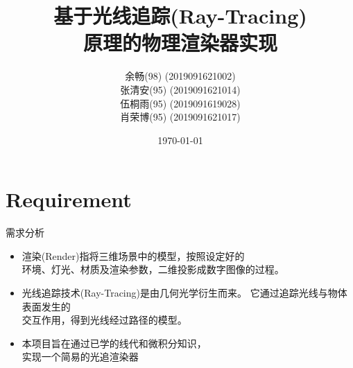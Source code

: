 \documentclass{beamer}
\begin{document}
\title[\sc Ray-Traing based Renderer]{\sc 基于光线追踪(Ray-Tracing) \\ 原理的物理渲染器实现}
\author{ \normalsize 余畅(98) \quad \tiny (2019091621002) \\
 \normalsize 张清安(95) \qquad \tiny (2019091621014) \\
 \normalsize 伍桐雨(95) \quad \tiny (2019091619028) \\
 \normalsize 肖荣博(95) \quad \tiny (2019091621017)}
\date{\today}
\frame{\titlepage}

\section{Requirement}
\begin{frame} {需求分析}
		\begin{itemize}
\item 渲染(Render)指将三维场景中的模型，按照设定好的 \\ 环境、灯光、材质及渲染参数，二维投影成数字图像的过程。
\item 光线追踪技术(Ray-Tracing)是由几何光学衍生而来。 它通过追踪光线与物体表面发生的 \\ 交互作用，得到光线经过路径的模型。
\item 本项目旨在通过已学的线代和微积分知识，\\实现一个简易的光追渲染器
\end{itemize}
\end{frame}
\end{document}
